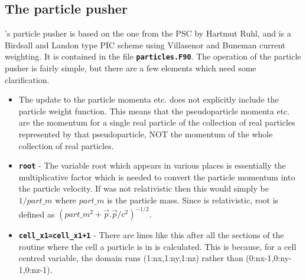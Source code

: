 \documentclass[12pt,a4paper]{article}
\newcommand{\inlinecode}[1]{{\color{warwickred} \bf\texttt{#1}}}
\newcommand{\EPOCH}{{\color{warwickdark}\fontfamily{phv}\selectfont{EPOCH}}}
\begin{document}
\subsection{The particle pusher}
{\EPOCH}'s particle pusher is based on the one from the PSC by Hartmut Ruhl, and
is a Birdsall and Landon type PIC scheme using Villasenor and Buneman current
weighting. It is contained in the file \inlinecode{particles.F90}. The
operation of the particle pusher is fairly simple, but there are a few elements
which need some clarification.
\begin{itemize}
\item The update to the particle momenta etc. does not explicitly include the
  particle weight function. This means that the pseudoparticle momenta etc. are
  the momentum for a single real particle of the collection of real particles
  represented by that pseudoparticle, NOT the momentum of the whole collection
  of real particles.
\item \inlinecode{root} - The variable root which appears in various places is
  essentially the multiplicative factor which is needed to convert the particle
  momentum into the particle velocity. If {\EPOCH} was not relativistic then
  this would simply be $1/part\_m$ where $part\_m$ is the particle mass.
  Since {\EPOCH} is relativistic, root is defined as $\left(part\_m^2 +
    \vec{p}.\vec{p}/c^2\right)^{-1/2}$.
\item \inlinecode{cell\_x1=cell\_x1+1} - There are lines like this after all
  the sections of the routine where the cell a particle is in is
  calculated. This is because, for a cell centred variable, the domain runs
  (1:nx,1:ny,1:nz) rather than (0:nx-1,0:ny-1,0:nz-1).
\end{itemize}
\end{document}
